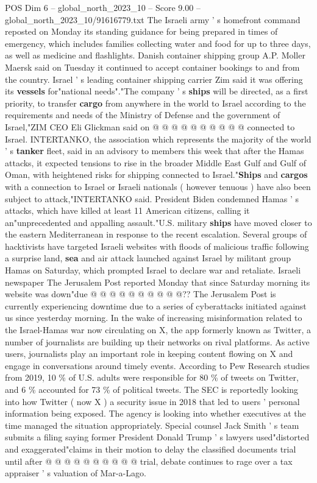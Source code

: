 \begin{textsample}{POS Dim 6 – global\_north\_2023\_10 – Score 9.00 – global\_north\_2023\_10/91616779.txt}
The Israeli army ' s homefront command reposted on Monday its standing guidance for being prepared in times of emergency, which includes families collecting water and food for up to three days, as well as medicine and flashlights.
Danish container shipping group A.P.
Moller Maersk said on Tuesday it continued to accept container bookings to and from the country.
Israel ' s leading container shipping carrier Zim said it was offering its \textbf{vessels} for"national needs"."The company ' s \textbf{ships} will be directed, as a first priority, to transfer \textbf{cargo} from anywhere in the world to Israel according to the requirements and needs of the Ministry of Defense and the government of Israel,"ZIM CEO Eli Glickman said on @ @ @ @ @ @ @ @ @ @ connected to Israel.
INTERTANKO, the association which represents the majority of the world ' s \textbf{tanker} fleet, said in an advisory to members this week that after the Hamas attacks, it expected tensions to rise in the broader Middle East Gulf and Gulf of Oman, with heightened risks for shipping connected to Israel."\textbf{Ships} and \textbf{cargos} with a connection to Israel or Israeli nationals ( however tenuous ) have also been subject to attack,"INTERTANKO said.
President Biden condemned Hamas ' s attacks, which have killed at least 11 American citizens, calling it an"unprecedented and appalling assault."U.S. military \textbf{ships} have moved closer to the eastern Mediterranean in response to the recent escalation.
Several groups of hacktivists have targeted Israeli websites with floods of malicious traffic following a surprise land, \textbf{sea} and air attack launched against Israel by militant group Hamas on Saturday, which prompted Israel to declare war and retaliate.
Israeli newspaper The Jerusalem Post reported Monday that since Saturday morning its website was down"due @ @ @ @ @ @ @ @ @ @??
The Jerusalem Post is currently experiencing downtime due to a series of cyberattacks initiated against us since yesterday morning.
In the wake of increasing misinformation related to the Israel-Hamas war now circulating on X, the app formerly known as Twitter, a number of journalists are building up their networks on rival platforms.
As active users, journalists play an important role in keeping content flowing on X and engage in conversations around timely events.
According to Pew Research studies from 2019, 10 \% of U.S. adults were responsible for 80 \% of tweets on Twitter, and 6 \% accounted for 73 \% of political tweets.
The SEC is reportedly looking into how Twitter ( now X ) a security issue in 2018 that led to users ' personal information being exposed.
The agency is looking into whether executives at the time managed the situation appropriately.
Special counsel Jack Smith ' s team submits a filing saying former President Donald Trump ' s lawyers used"distorted and exaggerated"claims in their motion to delay the classified documents trial until after @ @ @ @ @ @ @ @ @ @ trial, debate continues to rage over a tax appraiser ' s valuation of Mar-a-Lago.

\end{textsample}
